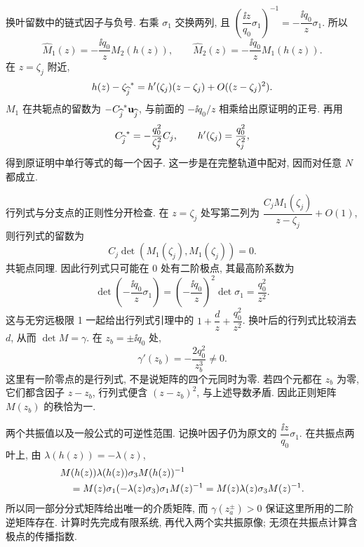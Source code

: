 \par\smallskip\noindent 换叶留数中的链式因子与负号.\quad
右乘 $\sigma_1$ 交换两列, 且
$\left(\dfrac{\ii z}{q_0}\sigma_1\right)^{-1}
=-\dfrac{\ii q_0}{z}\sigma_1$.
所以
\begin{equation*}
\widehat M_1(z)=-\dfrac{\ii q_0}{z}M_2(h(z)),\qquad
\widehat M_2(z)=-\dfrac{\ii q_0}{z}M_1(h(z)).
\end{equation*}
在 $z=\zeta_j$ 附近,
\begin{equation*}
h(z)-{\zeta_{\widehat j}}^{*}
=h'(\zeta_j)(z-\zeta_j)+O((z-\zeta_j)^2).
\end{equation*}
$M_1$ 在共轭点的留数为 $-{C_{\widehat j}}^{*}\mathbf u_{\widehat j}$,
与前面的 $-\ii q_0/z$ 相乘给出原证明的正号.
再用
\begin{equation*}
{C_{\widehat j}}^{*}=-\dfrac{q_0^2}{\zeta_j^2}C_j,
\qquad h'(\zeta_j)=\dfrac{q_0^2}{\zeta_j^2},
\end{equation*}
得到原证明中单行等式的每一个因子.
这一步是在完整轨道中配对, 因而对任意 $N$ 都成立.

\par\smallskip\noindent 行列式与分支点的正则性分开检查.\quad
在 $z=\zeta_j$ 处写第二列为
$\dfrac{C_jM_1(\zeta_j)}{z-\zeta_j}+O(1)$,
则行列式的留数为
\begin{equation*}
C_j\det(M_1(\zeta_j),M_1(\zeta_j))=0.
\end{equation*}
共轭点同理. 因此行列式只可能在 $0$ 处有二阶极点,
其最高阶系数为
\begin{equation*}
\det\left(-\dfrac{\ii q_0}{z}\sigma_1\right)
=\left(-\dfrac{\ii q_0}{z}\right)^2\det\sigma_1
=\dfrac{q_0^2}{z^2}.
\end{equation*}
这与无穷远极限 1 一起给出行列式引理中的 $1+\dfrac{d}{z}+\dfrac{q_0^2}{z^2}$.
换叶后的行列式比较消去 $d$, 从而 $\det M=\gamma$.
在 $z_b=\pm\ii q_0$ 处,
\begin{equation*}
\gamma'(z_b)=-\dfrac{2q_0^2}{z_b^3}\ne0.
\end{equation*}
这里有一阶零点的是行列式, 不是说矩阵的四个元同时为零.
若四个元都在 $z_b$ 为零, 它们都含因子 $z-z_b$,
行列式便含 $(z-z_b)^2$, 与上述导数矛盾.
因此正则矩阵 $M(z_b)$ 的秩恰为一.

\par\smallskip\noindent 两个共振值以及一般公式的可逆性范围.\quad
记换叶因子仍为原文的 $\dfrac{\ii z}{q_0}\sigma_1$.
在共振点两叶上, 由 $\lambda(h(z))=-\lambda(z)$,
\begin{equation*}
\begin{aligned}
&M(h(z))\lambda(h(z))\sigma_3 M(h(z))^{-1}\\
&\quad=M(z)\sigma_1(-\lambda(z)\sigma_3)\sigma_1M(z)^{-1}
=M(z)\lambda(z)\sigma_3 M(z)^{-1}.
\end{aligned}
\end{equation*}
所以同一部分分式矩阵给出唯一的介质矩阵,
而 $\gamma(z_a^\pm)>0$ 保证这里所用的二阶逆矩阵存在.
计算时先完成有限系统, 再代入两个实共振原像;
无须在共振点计算含极点的传播指数.

